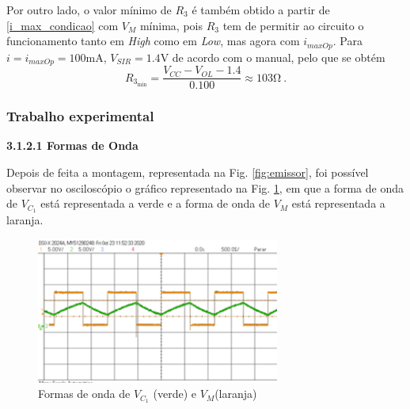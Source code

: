 Por outro lado, o valor mínimo de $R_3$ é também obtido a partir de \eqref{i_max_condicao} com $V_M$ mínima, pois $R_3$ tem de permitir ao circuito o funcionamento tanto em \textit{High} como em \textit{Low}, mas agora com $i_{maxOp}$. Para $i = i_{maxOp} = 100 \si{\milli \ampere}$, $V_{SIR} = 1.4 \si{\volt}$ de acordo com o manual, pelo que se obtém
\begin{equation*}
    R_{3_{\mathrm{min}}} = \frac{V_{CC} - V_{OL} - 1.4}{0.100} \approx 103 \si{\ohm}\:.
\end{equation*}




\subsubsection{Trabalho experimental}
\vspace{2mm}
\noindent\textbf{3.1.2.1 \hspace{1mm}Formas de Onda} \par
Depois de feita a montagem, representada na Fig. \ref{fig:emissor}, foi possível observar no osciloscópio o gráfico representado na Fig. \ref{fig:formas_onda}, em que a forma de onda de $V_{C_1}$ está representada a verde e a forma de onda de $V_M$ está representada a laranja.
\begin{figure}[ht]
    \centering
    \includegraphics[width=8cm]{Imagens/oscilador_formas_onda.png}
    \caption{Formas de onda de $V_{C_1}$ (verde) e $V_M$(laranja)}
    \label{fig:formas_onda}
\end{figure}


